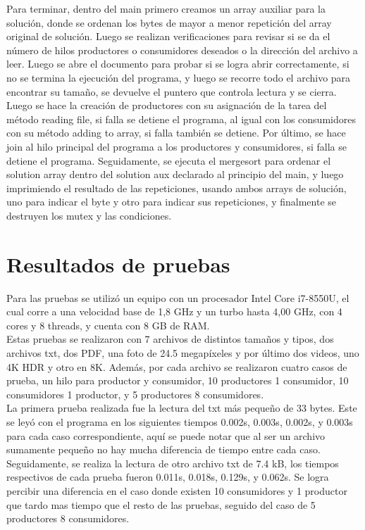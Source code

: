 \documentclass[12pt, article, natbib]{IEEEtran}
\begin{document}
Para terminar, dentro del main primero creamos un array auxiliar para la solución, donde se ordenan los bytes de mayor a menor repetición del array original de solución. Luego se realizan verificaciones para revisar si se da el número de hilos productores o consumidores deseados o la dirección del archivo a leer. Luego se abre el documento para probar si se logra abrir correctamente, si no se termina la ejecución del programa, y luego se recorre todo el archivo para encontrar su tamaño, se devuelve el puntero que controla lectura y se cierra. Luego se hace la creación de productores con su asignación de la tarea del método reading file, si falla se detiene el programa, al igual con los consumidores con su método adding to array, si falla también se detiene. Por último, se hace join al hilo principal del programa a los productores y consumidores, si falla se detiene el programa.\cite{kerrisk_2010_pthread_join3} Seguidamente, se ejecuta el mergesort para ordenar el solution array dentro del solution aux declarado al principio del main, y luego imprimiendo el resultado de las repeticiones, usando ambos arrays de solución, uno para indicar el byte y otro para indicar sus repeticiones, y finalmente se destruyen los mutex y las condiciones.\\

\section{Resultados de pruebas}
Para las pruebas se utilizó un equipo con un procesador Intel Core i7-8550U, el cual corre a una velocidad base de 1,8 GHz y un turbo hasta 4,00 GHz, con 4 cores y 8 threads, y cuenta con 8 GB de RAM.\\

Estas pruebas se realizaron con 7 archivos de distintos tamaños y tipos, dos archivos txt, dos PDF, una foto de 24.5 megapíxeles y por último dos videos, uno 4K HDR y otro en 8K. Además, por cada archivo se realizaron cuatro casos de prueba, un hilo para productor y consumidor, 10 productores 1 consumidor, 10 consumidores 1 productor, y 5 productores 8 consumidores.\\

La primera prueba realizada fue la lectura del txt más pequeño de 33 bytes. Este se leyó con el programa en los siguientes tiempos 0.002s, 0.003s, 0.002s, y 0.003s para cada caso correspondiente, aquí se puede notar que al ser un archivo sumamente pequeño no hay mucha diferencia de tiempo entre cada caso.
Seguidamente, se realiza la lectura de otro archivo txt de 7.4 kB, los tiempos respectivos de cada prueba fueron 0.011s, 0.018s, 0.129s, y 0.062s. Se logra percibir una diferencia en el caso donde existen 10 consumidores y 1 productor que tardo mas tiempo que el resto de las pruebas, seguido del caso de 5 productores 8 consumidores.\\
\end{document}
